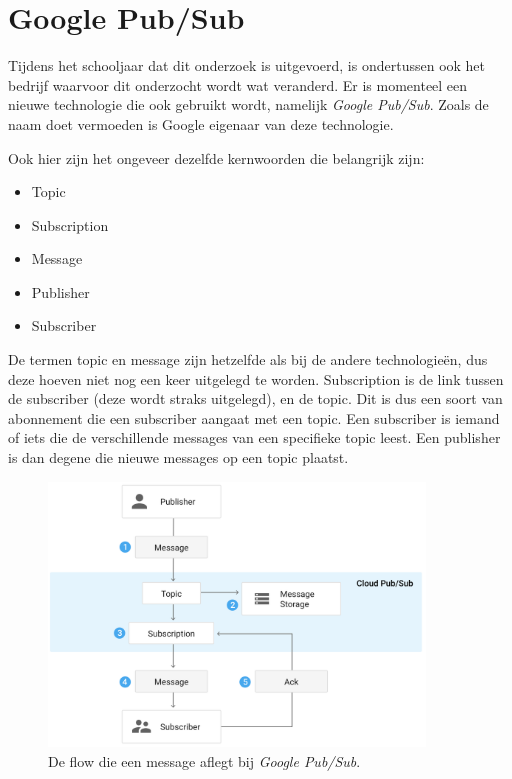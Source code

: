 \section{Google Pub/Sub}
Tijdens het schooljaar dat dit onderzoek is uitgevoerd, is ondertussen ook het bedrijf waarvoor dit onderzocht wordt wat veranderd. Er is momenteel een nieuwe technologie die ook gebruikt wordt, namelijk \emph{Google Pub/Sub}. Zoals de naam doet vermoeden is Google eigenaar van deze technologie. 

Ook hier zijn het ongeveer dezelfde kernwoorden die belangrijk zijn:
\begin{itemize}
    \item Topic
    \item Subscription
    \item Message
    \item Publisher
    \item Subscriber
\end{itemize}

De termen topic en message zijn hetzelfde als bij de andere technologieën, dus deze hoeven niet nog een keer uitgelegd te worden. Subscription is de link tussen de subscriber (deze wordt straks uitgelegd), en de topic. Dit is dus een soort van abonnement die een subscriber aangaat met een topic. Een subscriber is iemand of iets die de verschillende messages van een specifieke topic leest. Een publisher is dan degene die nieuwe messages op een topic plaatst.

 \begin{figure}[h!]
    \centering
    \includegraphics[width=100mm]{../gpsFlow.png}
    \caption{De flow die een message aflegt bij \emph{Google Pub/Sub}.}
    
\end{figure}

